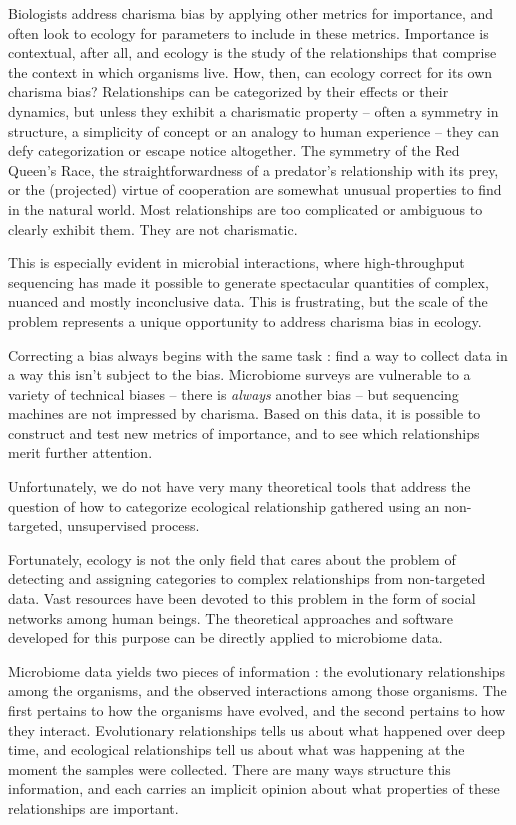 \documentclass[
10pt, %
a4paper, %
oneside, %
headinclude,footinclude, %
BCOR5mm, %
]{scrartcl}
\begin{document}
Biologists address charisma bias by applying other metrics for importance, and often look to ecology for parameters to include in these metrics. Importance is contextual, after all, and ecology is the study of the relationships that comprise the context in which organisms live. How, then, can ecology correct for its own charisma bias? Relationships can be categorized by their effects or their dynamics, but unless they exhibit a charismatic property -- often a symmetry in structure, a simplicity of concept or an analogy to human experience -- they can defy categorization or escape notice altogether. The symmetry of the Red Queen's Race, the straightforwardness of a predator's relationship with its prey, or the (projected) virtue of cooperation are somewhat unusual properties to find in the natural world. Most relationships are too complicated or ambiguous to clearly exhibit them. They are not charismatic.





This is especially evident in microbial interactions, where high-throughput sequencing has made it possible to generate spectacular quantities of complex, nuanced and mostly inconclusive data. This is frustrating, but the scale of the problem represents a unique opportunity to address charisma bias in ecology.

Correcting a bias always begins with the same task : find a way to collect data in a way this isn't subject to the bias. Microbiome surveys are vulnerable to a variety of technical biases -- there is {\em always} another bias -- but sequencing machines are not impressed by charisma. Based on this data, it is possible to construct and test new metrics of importance, and to see which relationships merit further attention.

Unfortunately, we do not have very many theoretical tools that address the question of how to categorize ecological relationship gathered using an non-targeted, unsupervised process.

Fortunately, ecology is not the only field that cares about the problem of detecting and assigning categories to complex relationships from non-targeted data. Vast resources have been devoted to this problem in the form of social networks among human beings. The theoretical approaches and software developed for this purpose can be directly applied to microbiome data.

Microbiome data yields two pieces of information : the evolutionary relationships among the organisms, and the observed interactions among those organisms. The first pertains to how the organisms have evolved, and the second pertains to how they interact. Evolutionary relationships tells us about what happened over deep time, and ecological relationships tell us about what was happening at the moment the samples were collected. There are many ways structure this information, and each carries an implicit opinion about what properties of these relationships are important.
\end{document}
